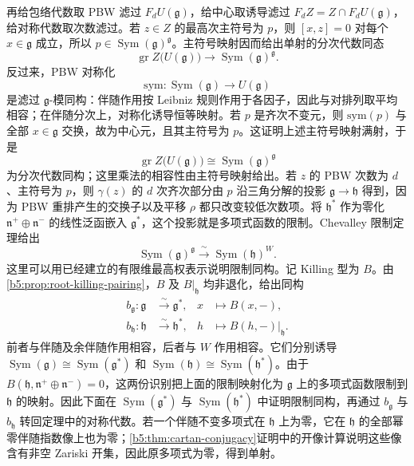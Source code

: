 \begin{proofsketch}
	再给包络代数取 PBW 滤过 \(F_dU(\mathfrak g)\)，给中心取诱导滤过 \(F_dZ=Z\cap F_dU(\mathfrak g)\)，给对称代数取次数滤过。若 \(z\in Z\) 的最高次主符号为 \(p\)，则 \([x,z]=0\) 对每个 \(x\in\mathfrak g\) 成立，所以 \(p\in\operatorname{Sym}(\mathfrak g)^{\mathfrak g}\)。主符号映射因而给出单射的分次代数同态
	\[
		\operatorname{gr}Z\bigl(U(\mathfrak g)\bigr) \longrightarrow\operatorname{Sym}(\mathfrak g)^{\mathfrak g}.
	\]
	反过来，PBW 对称化
	\[
		\mathrm{sym}:\operatorname{Sym}(\mathfrak g)\longrightarrow U(\mathfrak g)
	\]
	是滤过 \(\mathfrak g\)-模同构：伴随作用按 Leibniz 规则作用于各因子，因此与对排列取平均相容；在伴随分次上，对称化诱导恒等映射。若 \(p\) 是齐次不变元，则 \(\mathrm{sym}(p)\) 与全部 \(x\in\mathfrak g\) 交换，故为中心元，且其主符号为 \(p\)。这证明上述主符号映射满射，于是
	\[
		\operatorname{gr}Z\bigl(U(\mathfrak g)\bigr) \cong\operatorname{Sym}(\mathfrak g)^{\mathfrak g}
	\]
	为分次代数同构；这里乘法的相容性由主符号映射给出。若 \(z\) 的 PBW 次数为 \(d\)、主符号为 \(p\)，则 \(\gamma(z)\) 的 \(d\) 次齐次部分由 \(p\) 沿三角分解的投影 \(\mathfrak g\to\mathfrak h\) 得到，因为 PBW 重排产生的交换子以及平移 \(\rho\) 都只改变较低次数项。将 \(\mathfrak h^*\) 作为零化 \(\mathfrak n^+\oplus\mathfrak n^-\) 的线性泛函嵌入 \(\mathfrak g^*\)，这个投影就是多项式函数的限制。Chevalley 限制定理给出
	\[
		\operatorname{Sym}(\mathfrak g)^{\mathfrak g} \xrightarrow{\ \sim\ } \operatorname{Sym}(\mathfrak h)^W.
	\]
	这里可以用已经建立的有限维最高权表示说明限制同构。记 Killing 型为 \(B\)。由\cref{b5:prop:root-killing-pairing}，\(B\) 及 \(B|_{\mathfrak h}\) 均非退化，给出同构
	\[
		\begin{aligned}
			b_{\mathfrak g}:\mathfrak g&\xrightarrow{\sim}\mathfrak g^*, &x&\longmapsto B(x,-),\\
			b_{\mathfrak h}:\mathfrak h&\xrightarrow{\sim}\mathfrak h^*, &h&\longmapsto B(h,-)|_{\mathfrak h}.
		\end{aligned}
	\]
	前者与伴随及余伴随作用相容，后者与 \(W\) 作用相容。它们分别诱导 \(\operatorname{Sym}(\mathfrak g)\cong\operatorname{Sym}(\mathfrak g^*)\) 和 \(\operatorname{Sym}(\mathfrak h)\cong\operatorname{Sym}(\mathfrak h^*)\)。由于 \(B(\mathfrak h,\mathfrak n^+\oplus\mathfrak n^-)=0\)，这两份识别把上面的限制映射化为 \(\mathfrak g\) 上的多项式函数限制到 \(\mathfrak h\) 的映射。因此下面在 \(\operatorname{Sym}(\mathfrak g^*)\) 与 \(\operatorname{Sym}(\mathfrak h^*)\) 中证明限制同构，再通过 \(b_{\mathfrak g}\) 与 \(b_{\mathfrak h}\) 转回定理中的对称代数。若一个伴随不变多项式在 \(\mathfrak h\) 上为零，它在 \(\mathfrak h\) 的全部幂零伴随指数像上也为零；\cref{b5:thm:cartan-conjugacy}证明中的开像计算说明这些像含有非空 Zariski 开集，因此原多项式为零，得到单射。


\end{proofsketch}
